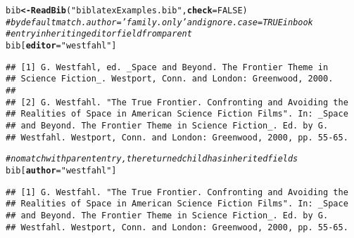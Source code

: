 \documentclass[article]{jss}\usepackage[]{graphicx}\usepackage[]{color}
\makeatletter
\newcommand{\hlnum}[1]{\textcolor[rgb]{0.125,0.125,1}{#1}}%
\newcommand{\hlstr}[1]{\textcolor[rgb]{0.125,0.125,1}{#1}}%
\newcommand{\hlcom}[1]{\textcolor[rgb]{1,0,0.753}{\textit{#1}}}%
\newcommand{\hlstd}[1]{\textcolor[rgb]{0.251,0.251,0.282}{#1}}%
\newcommand{\hlkwb}[1]{\textcolor[rgb]{0.439,0.251,1}{\textbf{#1}}}%
\newcommand{\hlkwc}[1]{\textcolor[rgb]{0.529,0,0.184}{\textbf{#1}}}%
\newcommand{\hlkwd}[1]{\textcolor[rgb]{0.251,0.251,0.282}{\textbf{#1}}}%
\newenvironment{kframe}{%
 \def\at@end@of@kframe{}%
 \ifinner\ifhmode%
  \def\at@end@of@kframe{\end{minipage}}%
  \begin{minipage}{\columnwidth}%
 \fi\fi%
 \def\FrameCommand##1{\hskip\@totalleftmargin \hskip-\fboxsep
 \colorbox{shadecolor}{##1}\hskip-\fboxsep
     \hskip-\linewidth \hskip-\@totalleftmargin \hskip\columnwidth}%
 \MakeFramed {\advance\hsize-\width
   \@totalleftmargin\z@ \linewidth\hsize
   \@setminipage}}%
 {\par\unskip\endMakeFramed%
 \at@end@of@kframe}
\newenvironment{knitrout}{}{} %
\makeatother
\begin{document}
\begin{knitrout}
\color{fgcolor}\begin{kframe}
\begin{alltt}
\hlstd{bib} \hlkwb{<-} \hlkwd{ReadBib}\hlstd{(}\hlstr{"biblatexExamples.bib"}\hlstd{,} \hlkwc{check} \hlstd{=} \hlnum{FALSE}\hlstd{)}
\hlcom{# by default match.author = 'family.only' and ignore.case = TRUE inbook}
\hlcom{# entry inheriting editor field from parent}
\hlstd{bib[}\hlkwc{editor} \hlstd{=} \hlstr{"westfahl"}\hlstd{]}
\end{alltt}
\begin{verbatim}
## [1] G. Westfahl, ed. _Space and Beyond. The Frontier Theme in
## Science Fiction_. Westport, Conn. and London: Greenwood, 2000.
## 
## [2] G. Westfahl. "The True Frontier. Confronting and Avoiding the
## Realities of Space in American Science Fiction Films". In: _Space
## and Beyond. The Frontier Theme in Science Fiction_. Ed. by G.
## Westfahl. Westport, Conn. and London: Greenwood, 2000, pp. 55-65.
\end{verbatim}
\begin{alltt}
\hlcom{# no match with parent entry, the returned child has inherited fields}
\hlstd{bib[}\hlkwc{author} \hlstd{=} \hlstr{"westfahl"}\hlstd{]}
\end{alltt}
\begin{verbatim}
## [1] G. Westfahl. "The True Frontier. Confronting and Avoiding the
## Realities of Space in American Science Fiction Films". In: _Space
## and Beyond. The Frontier Theme in Science Fiction_. Ed. by G.
## Westfahl. Westport, Conn. and London: Greenwood, 2000, pp. 55-65.
\end{verbatim}
\end{kframe}
\end{knitrout}
\end{document}
